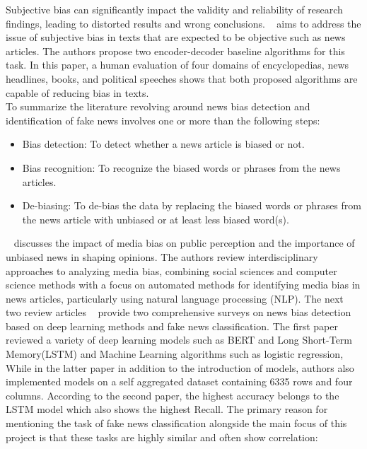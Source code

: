 \documentclass[11pt,a4paper]{article}
\begin{document}
Subjective bias can significantly impact the validity and reliability of research findings, leading to distorted results and wrong conclusions. ~\cite{pryzant_2020_automatically} aims to address the issue of subjective bias in texts that are expected to be objective such as news articles. The authors propose two encoder-decoder baseline algorithms for this task. In this paper, a human evaluation of four domains of encyclopedias, news headlines, books, and political speeches shows that both proposed algorithms are capable of reducing bias in texts.\\
To summarize the literature revolving around news bias detection and identification of fake news involves one or more than the following steps:
\begin{itemize}
    \item Bias detection: To detect whether a news article is biased or not.
    \item Bias recognition: To recognize the biased words or phrases from the news articles.
    \item De-biasing: To de-bias the data by replacing the biased words or phrases from the news article with unbiased or at least less biased word(s).
\end{itemize}
~\cite{hamborg_2018_automated}  discusses the impact of media bias on public perception and the importance of unbiased news in shaping opinions. The authors review interdisciplinary approaches to analyzing media bias, combining social sciences and computer science methods with a focus on automated methods for identifying media bias in news articles, particularly using natural language processing (NLP).
The next two review articles ~\cite{khushirakhecha_2023_a,rohera_2022_a} provide two comprehensive surveys on news bias detection based on deep learning methods and fake news classification. The first paper reviewed a variety of deep learning models such as BERT and Long Short-Term Memory(LSTM) and Machine Learning algorithms such as logistic regression, While in the latter paper in addition to the introduction of models, authors also implemented models on a self aggregated dataset containing 6335 rows and four columns. According to the second paper, the highest accuracy belongs to the LSTM model which also shows the highest Recall. The primary reason for mentioning the task of fake news classification alongside the main focus of this project is that these tasks are highly similar and often show correlation:
\end{document}
